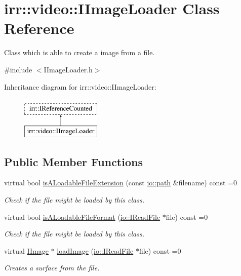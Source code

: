 \hypertarget{classirr_1_1video_1_1IImageLoader}{}\section{irr\+:\+:video\+:\+:I\+Image\+Loader Class Reference}
\label{classirr_1_1video_1_1IImageLoader}


Class which is able to create a image from a file.  




{\ttfamily \#include $<$I\+Image\+Loader.\+h$>$}

Inheritance diagram for irr\+:\+:video\+:\+:I\+Image\+Loader\+:\begin{figure}[H]
\begin{center}
\leavevmode
\includegraphics[height=2.000000cm]{classirr_1_1video_1_1IImageLoader}
\end{center}
\end{figure}
\subsection*{Public Member Functions}
\begin{DoxyCompactItemize}
\item 
virtual bool \hyperlink{classirr_1_1video_1_1IImageLoader_ad8c467efd18e7c74f845029083764df3}{is\+A\+Loadable\+File\+Extension} (const \hyperlink{namespaceirr_1_1io_ab1bdc45edb3f94d8319c02bc0f840ee1}{io\+::path} \&filename) const  =0
\begin{DoxyCompactList}\small\item\em Check if the file might be loaded by this class. \end{DoxyCompactList}\item 
virtual bool \hyperlink{classirr_1_1video_1_1IImageLoader_ad577be0a3111c625f60cb5204454a0be}{is\+A\+Loadable\+File\+Format} (\hyperlink{classirr_1_1io_1_1IReadFile}{io\+::\+I\+Read\+File} $\ast$file) const  =0
\begin{DoxyCompactList}\small\item\em Check if the file might be loaded by this class. \end{DoxyCompactList}\item 
virtual \hyperlink{classirr_1_1video_1_1IImage}{I\+Image} $\ast$ \hyperlink{classirr_1_1video_1_1IImageLoader_a6f3241106908fe8c9c0c929fe1fe770b}{load\+Image} (\hyperlink{classirr_1_1io_1_1IReadFile}{io\+::\+I\+Read\+File} $\ast$file) const  =0
\begin{DoxyCompactList}\small\item\em Creates a surface from the file. \end{DoxyCompactList}\end{DoxyCompactItemize}
